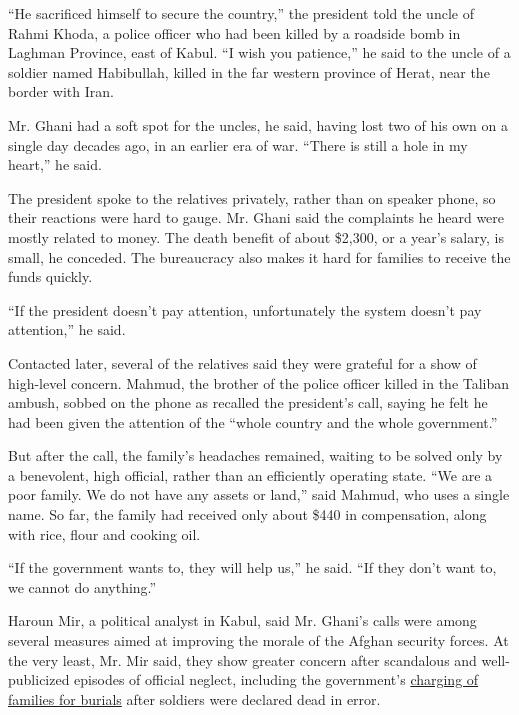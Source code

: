 ``He sacrificed himself to secure the country,'' the president told the
uncle of Rahmi Khoda, a police officer who had been killed by a roadside
bomb in Laghman Province, east of Kabul. ``I wish you patience,'' he
said to the uncle of a soldier named Habibullah, killed in the far
western province of Herat, near the border with Iran.

Mr. Ghani had a soft spot for the uncles, he said, having lost two of
his own on a single day decades ago, in an earlier era of war. ``There
is still a hole in my heart,'' he said.

The president spoke to the relatives privately, rather than on speaker
phone, so their reactions were hard to gauge. Mr. Ghani said the
complaints he heard were mostly related to money. The death benefit of
about \$2,300, or a year's salary, is small, he conceded. The
bureaucracy also makes it hard for families to receive the funds
quickly.

``If the president doesn't pay attention, unfortunately the system
doesn't pay attention,'' he said.

Contacted later, several of the relatives said they were grateful for a
show of high-level concern. Mahmud, the brother of the police officer
killed in the Taliban ambush, sobbed on the phone as recalled the
president's call, saying he felt he had been given the attention of the
``whole country and the whole government.''

But after the call, the family's headaches remained, waiting to be
solved only by a benevolent, high official, rather than an efficiently
operating state. ``We are a poor family. We do not have any assets or
land,'' said Mahmud, who uses a single name. So far, the family had
received only about \$440 in compensation, along with rice, flour and
cooking oil.

``If the government wants to, they will help us,'' he said. ``If they
don't want to, we cannot do anything.''

Haroun Mir, a political analyst in Kabul, said Mr. Ghani's calls were
among several measures aimed at improving the morale of the Afghan
security forces. At the very least, Mr. Mir said, they show greater
concern after scandalous and well-publicized episodes of official
neglect, including the government's
\href{http://www.nytimes3xbfgragh.onion/2016/04/18/world/asia/afghanistan-declares-soldiers-dead-then-alive-and-in-debt-for-funerals.html}{charging
of families for burials} after soldiers were declared dead in error.

